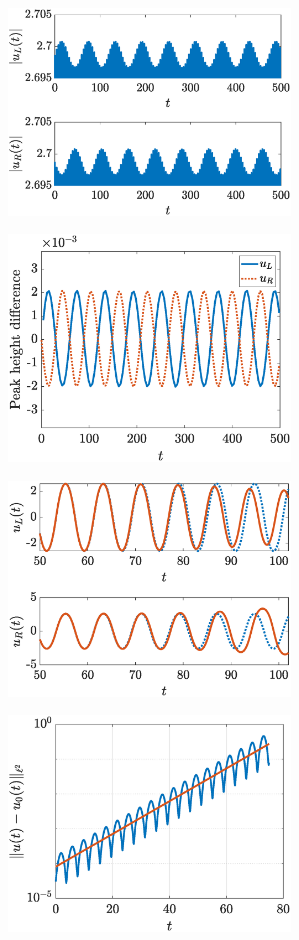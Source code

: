 \documentclass[12pt,reqno]{amsart}
\theoremstyle{definition}
\begin{document}
\begin{figure}
	\begin{center}
	\begin{subfigure}{0.45\linewidth}
		\caption{}
		\includegraphics[width=7.5cm]{timestepN6.eps}
		\label{fig:timestepSGa}
	\end{subfigure}
	\begin{subfigure}{0.45\linewidth}
		\caption{}
		\includegraphics[width=7.5cm]{timestepN6pks.eps}
		\label{fig:timestepSGb}
	\end{subfigure}
	\begin{subfigure}{0.45\linewidth}
		\caption{}
		\includegraphics[width=7.5cm]{timestepN6pp.eps}
		\label{fig:timestepSGc}
	\end{subfigure}
	\begin{subfigure}{0.45\linewidth}
		\caption{}
		\includegraphics[width=7.5cm]{timestepN6growth.eps}

\end{subfigure}
\end{center}
\end{figure}
\end{document}
